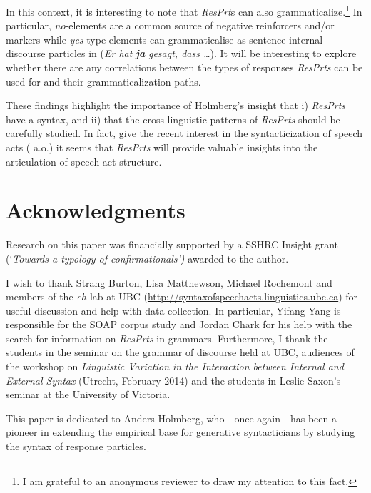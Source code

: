 \documentclass[output=paper]{LSP/langsci}
\begin{document}
In this context, it is interesting to note that \textit{ResPrt}s can also grammaticalize.\footnote{I am grateful to an anonymous reviewer to draw my attention to this fact.}  In particular, \textit{no}{}-elements are a common source of negative reinforcers and/or   markers \citep{Zanuttini1997,Poletto2008negativedoubling,Poletto2008focusnegation,deVosVanderAuwera2013}  while \textit{yes}{}-type elements can grammaticalise as sentence-internal discourse particles in  (\textit{Er hat} \textbf{\textit{ja}} \textit{gesagt, dass …}). It will be interesting to explore whether there are any correlations between the types of responses \textit{ResPrts} can be used for and their grammaticalization paths. 

These findings highlight the importance of Holmberg’s insight that 
i) \textit{ResPrts} have a syntax, and 
ii) that the cross-linguistic patterns of \textit{ResPrts} should be carefully studied.
In fact, give the recent interest in the syntacticization of speech acts (\citealt{SpeasTenny2003,Sigurdsson2004,Giorgi2010,Giorgi2015,Haegeman2013,HaegemanHill2013} a.o.) it seems that \textit{ResPrts} will provide valuable insights into the articulation of speech act structure.

\section*{Acknowledgments}

Research on this paper was financially supported by a SSHRC Insight grant (‘\textit{Towards a typology of confirmationals’)} awarded to the author.

I wish to thank Strang Burton, Lisa Matthewson, Michael Rochemont and members of the \textit{eh-}lab at UBC (\url{http://syntaxofspeechacts.linguistics.ubc.ca}) for useful discussion and help with data collection. In particular, Yifang Yang is responsible for the SOAP corpus study and Jordan Chark for his help with the search for information on \textit{ResPrts} in grammars. Furthermore, I thank the students in the seminar on the grammar of discourse held at UBC, audiences of the workshop on \textit{Linguistic Variation in the Interaction between Internal and External Syntax} (Utrecht, February 2014) and the students in Leslie Saxon’s seminar at the University of Victoria.

This paper is dedicated to Anders Holmberg, who - once again - has been a pioneer in extending the empirical base for generative syntacticians by studying the syntax of response particles.
 
{\sloppy\printbibliography[heading=subbibliography,notkeyword=this]}
\end{document}
